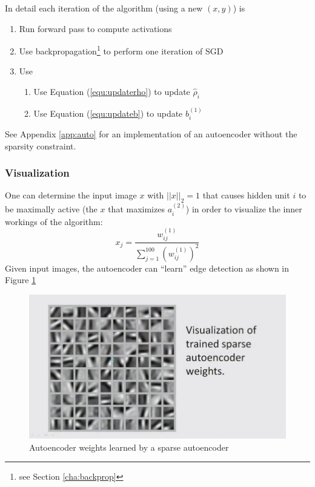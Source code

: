 \documentclass[a4paper,twoside,10pt]{article}
\begin{document}
In detail each iteration of the algorithm (using a new $(x,y)$) is
\begin{enumerate}
  \item Run forward pass to compute activations
  \item Use backpropagation\footnote{see Section \ref{cha:backprop}} to perform one iteration of \acf{SGD}
  \item Use
    \begin{enumerate}
      \item Use Equation (\ref{equ:updaterho}) to update $\widehat{\rho}_i$
      \item Use Equation (\ref{equ:updateb}) to update $b^{(1)}_i$
    \end{enumerate}
\end{enumerate}
See Appendix \ref{app:auto} for an implementation of an autoencoder without the sparsity constraint.

\subsubsection{Visualization}
One can determine the input image $x$ with $||x||_2=1$ that causes hidden unit $i$ to be maximally active (the $x$ that maximizes $a^{(2)}_i$) in order to visualize the inner workings of the algorithm:
\begin{equation*}
  x_j=\frac{w^{(1)}_{ij}}{\displaystyle\sum_{j=1}^{100}(w^{(1)}_{ij})^2}
\end{equation*}
Given input images, the autoencoder can ``learn'' edge detection as shown in Figure \ref{fig:autoimage}
\begin{figure}[htbp]
  \begin{center}
    \includegraphics[width=.6\textwidth]{autoimage}
    \caption{Autoencoder weights learned by a sparse autoencoder\citep{andrewngsparse2}\label{fig:autoimage}}
  \end{center}
\end{figure}
\end{document}
